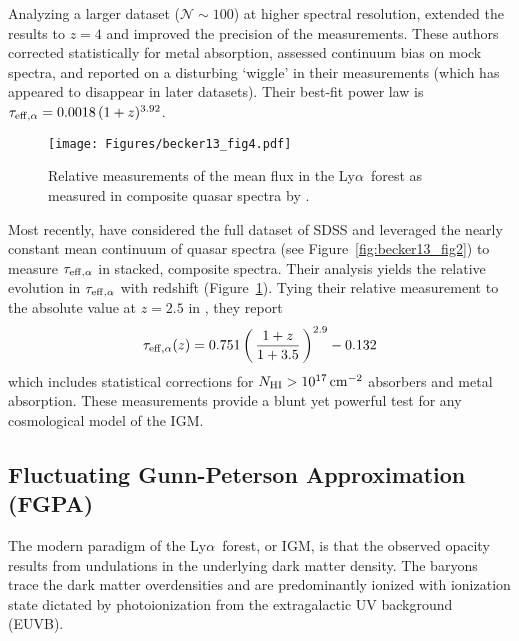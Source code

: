 \documentclass[graybox]{svmult}
\def\lya{Ly$\alpha$}
\def\ltp{\left ( \,}
\def\rtp{\, \right  ) }
\newcommand{\mnhi}{N_{\rm HI}}
\def\cm#1{\, {\rm cm^{#1}}}
\begin{document}
Analyzing a larger dataset ($\mathcal{N} \sim 100$)
at higher spectral
resolution, \cite{fpl+08} extended the results
to $z=4$ and improved the precision of the
measurements.  These authors
corrected statistically for metal absorption,
assessed continuum bias on mock spectra, and
reported on a disturbing `wiggle' in their measurements
(which has appeared to disappear in later datasets).
Their best-fit power law
is $\tau_{\rm eff, \alpha} = 0.0018 \, (1+z)^{3.92}$.

%
\begin{figure}[b]
\sidecaption
\texttt{[image: Figures/becker13\_fig4.pdf]}
%
%
\caption{Relative measurements of the mean flux in the 
\lya\ forest as measured in composite quasar spectra
by \cite{becker+13}.
}
\label{fig:rel_teff}       %
\end{figure}

Most recently, \cite{becker+13} have considered the full dataset
of SDSS and leveraged the nearly constant mean continuum of
quasar spectra (see Figure~\ref{fig:becker13_fig2}) to
measure $\tau_{\rm eff,\alpha}$ in stacked, composite spectra.
Their analysis yields the relative evolution in $\tau_{\rm eff,\alpha}$
with redshift (Figure~\ref{fig:rel_teff}).
Tying their relative measurement to the absolute value at
$z=2.5$ in \cite{fpl+08}, they report
\begin{equation}
\tau_{\rm eff, \alpha}(z) = 0.751 \ltp \frac{1+z}{1+3.5} 
\rtp^{2.9}  - 0.132
\end{equation}
which includes
statistical corrections for $\mnhi > 10^{17} \cm{-2}$ absorbers 
and metal absorption.
These measurements provide a blunt yet powerful test
for any cosmological model of the IGM.

\subsection{Fluctuating Gunn-Peterson Approximation (FGPA)}
The modern paradigm of the \lya\ forest, or IGM,
is that the observed opacity results from undulations
in the underlying dark matter density.  The baryons
trace the dark matter overdensities and are predominantly
ionized with ionization state dictated by photoionization
from the extragalactic UV background (EUVB).
\end{document}
